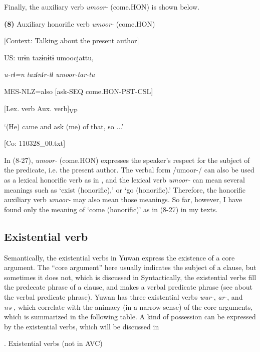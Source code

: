   Finally, the auxiliary verb \textit{umoor-} (come.HON) is shown below.

\textbf{(8)}  Auxiliary honorific verb \textit{umoor-} (come.HON)

  [Context: Talking about the present author]

  US:  urɨn  tazɨnɨtɨ  umoocjattu,

    \textit{u-rɨ=n}  \textit{tazɨnɨr-tɨ}  \textit{umoor{}-tar-tu}

    MES-NLZ=also  [ask-SEQ  come.HON-PST-CSL]

      [Lex. verb  Aux. verb]\textsubscript{VP}

    ‘(He) came and ask (me) of that, so ...’

    [Co: 110328\_00.txt]

In (8-27), \textit{umoor-} (come.HON) expresses the speaker’s respect for the subject of the predicate, i.e. the present author. The verbal form /umoor-/ can also be used as a lexical honorific verb as in , and the lexical verb \textit{umoor-} can mean several meanings such as ‘exist (honorific),’ or ‘go (honorific).’ Therefore, the honorific auxiliary verb \textit{umoor-} may also mean those meanings. So far, however, I have found only the meaning of ‘come (honorific)’ as in (8-27) in my texts.

\subsection{Existential verb}

Semantically, the existential verbs in Yuwan express the existence of a core argument. The “core argument” here usually indicates the subject of a clause, but sometimes it does not, which is discussed in  Syntactically, the existential verbs fill the predecate phrase of a clause, and makes a verbal predicate phrase (see  about the verbal predicate phrase). Yuwan has three existential verbs \textit{wur-}, \textit{ar-}, and \textit{nə-}, which correlate with the animacy (in a narrow sense) of the core arguments, which is summarized in the following table. A kind of possession can be expressed by the existential verbs, which will be discussed in 

\begin{styleBeschriftung}
\textmd{}\textmd{. Existential verbs (not in AVC)}
\end{styleBeschriftung}

